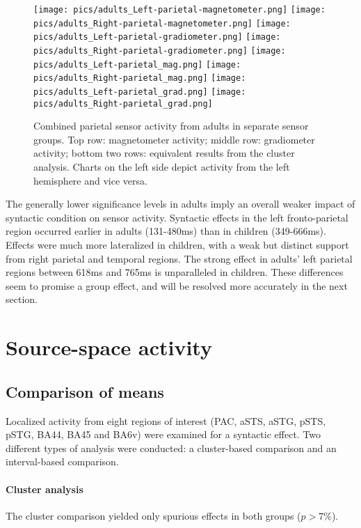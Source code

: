 \begin{figure}[!h]
\begin{center}
\texttt{[image: pics/adults\_Left-parietal-magnetometer.png]}
\texttt{[image: pics/adults\_Right-parietal-magnetometer.png]}
\texttt{[image: pics/adults\_Left-parietal-gradiometer.png]}
\texttt{[image: pics/adults\_Right-parietal-gradiometer.png]}
\texttt{[image: pics/adults\_Left-parietal\_mag.png]}
\texttt{[image: pics/adults\_Right-parietal\_mag.png]}
\texttt{[image: pics/adults\_Left-parietal\_grad.png]}
\texttt{[image: pics/adults\_Right-parietal\_grad.png]}
\caption{\label{4.2.activity.adults.parietal} Combined parietal sensor activity from adults in separate sensor groups. Top row: magnetometer activity; middle row: gradiometer activity; bottom two rows: equivalent results from the cluster analysis. Charts on the left side depict activity from the left hemisphere and vice versa.}
\end{center}
\end{figure}


The generally lower significance levels in adults imply an overall weaker impact of syntactic condition on sensor activity.
Syntactic effects in the left fronto-parietal region occurred earlier in adults (131-480ms) than in children (349-666ms).
Effects were much more lateralized in children, with a weak but distinct support from right parietal and temporal regions.
The strong effect in adults' left parietal regions between 618ms and 765ms is unparalleled in children.
These differences seem to promise a group effect, and will be resolved more accurately in the next section.

\clearpage\section{Source-space activity}\label{4.3}

\subsection{Comparison of means}
Localized activity from eight regions of interest (PAC, aSTS, aSTG, pSTS, pSTG, BA44, BA45 and BA6v) were examined for a syntactic effect.
Two different types of analysis were conducted: a cluster-based comparison and an interval-based comparison.

\paragraph{Cluster analysis}
The cluster comparison yielded only spurious effects in both groups ($p > 7\%$).

